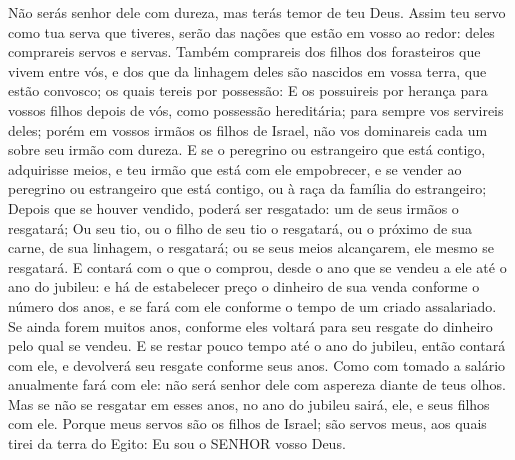 {{  Não serás senhor dele com dureza, mas terás temor de teu Deus.
  Assim teu servo como tua serva que tiveres, serão das nações que estão em vosso ao redor: deles comprareis servos e servas.
  Também comprareis dos filhos dos forasteiros que vivem entre vós, e dos que da linhagem deles são nascidos em vossa terra, que estão convosco; os quais tereis por possessão:
  E os possuireis por herança para vossos filhos depois de vós, como possessão hereditária; para sempre vos servireis deles; porém em vossos irmãos os filhos de Israel, não vos dominareis cada um sobre seu irmão com dureza.
  E se o peregrino ou estrangeiro que está contigo, adquirisse meios, e teu irmão que está com ele empobrecer, e se vender ao peregrino ou estrangeiro que está contigo, ou à raça da família do estrangeiro;
  Depois que se houver vendido, poderá ser resgatado: um de seus irmãos o resgatará;
  Ou seu tio, ou o filho de seu tio o resgatará, ou o próximo de sua carne, de sua linhagem, o resgatará; ou se seus meios alcançarem, ele mesmo se resgatará.
  E contará com o que o comprou, desde o ano que se vendeu a ele até o ano do jubileu: e há de estabelecer preço o dinheiro de sua venda conforme o número dos anos, e se fará com ele conforme o tempo de um criado assalariado.
  Se ainda forem muitos anos, conforme eles voltará para seu resgate do dinheiro pelo qual se vendeu.
  E se restar pouco tempo até o ano do jubileu, então contará com ele, e devolverá seu resgate conforme seus anos.
  Como com tomado a salário anualmente fará com ele: não será senhor dele com aspereza diante de teus olhos.
  Mas se não se resgatar em esses anos, no ano do jubileu sairá, ele, e seus filhos com ele.
  Porque meus servos são os filhos de Israel; são servos meus, aos quais tirei da terra do Egito: Eu sou o SENHOR vosso Deus}.
\par }

